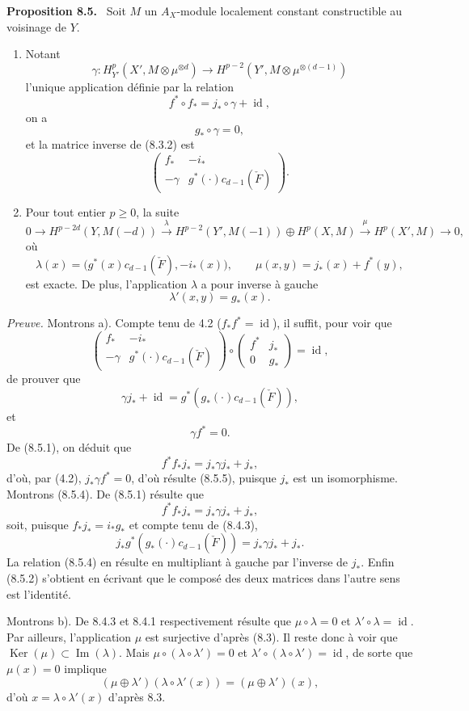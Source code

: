 \documentclass[11pt]{article}
\newenvironment{statement}[1]{\par\medskip\noindent\textbf{#1.}\ }{\par\medskip}
\providecommand{\Ker}{\operatorname{Ker}}
\providecommand{\Ker}{\operatorname{Ker}}
\providecommand{\Ker}{\operatorname{Ker}}
\begin{document}
\begin{statement}{Proposition 8.5}
Soit $M$ un $A_X$-module localement constant constructible au voisinage de $Y$.
\begin{enumerate}[label=\alph*)]
\item Notant
\[
\gamma:H_{Y'}^p(X',M\otimes\mu^{\otimes d})\to
H^{p-2}(Y',M\otimes\mu^{\otimes(d-1)})
\]
l'unique application définie par la relation
\[
f^*\circ f_* = j_*\circ\gamma+\operatorname{id},
\tag{8.5.1}
\]
on a
\[
g_*\circ\gamma=0,
\tag{8.5.2}
\]
et la matrice inverse de (8.3.2) est
\[
\begin{pmatrix}
f_*&-i_*\\
-\gamma&g^*(\cdot)c_{d-1}(\check F)
\end{pmatrix}.
\tag{8.5.3}
\]
\item Pour tout entier $p\ge0$, la suite
\[
0\to H^{p-2d}(Y,M(-d))
\xrightarrow{\lambda}
H^{p-2}(Y',M(-1))\oplus H^p(X,M)
\xrightarrow{\mu}
H^p(X',M)\to0,
\]
où
\[
\lambda(x)=\bigl(g^*(x)c_{d-1}(\check F),-i_*(x)\bigr),
\qquad
\mu(x,y)=j_*(x)+f^*(y),
\]
est exacte. De plus, l'application $\lambda$ a pour inverse à gauche
\[
\lambda'(x,y)=g_*(x).
\]
\end{enumerate}
\end{statement}

\emph{Preuve.} Montrons a). Compte tenu de 4.2 ($f_*f^*=\operatorname{id}$), il suffit, pour voir que
\[
\begin{pmatrix}
f_*&-i_*\\
-\gamma&g^*(\cdot)c_{d-1}(\check F)
\end{pmatrix}
\circ
\begin{pmatrix}
f^*&j_*\\
0&g_*
\end{pmatrix}
=\operatorname{id},
\]
de prouver que
\[
\gamma j_*+\operatorname{id}=g^*(g_*(\cdot)c_{d-1}(\check F)),
\tag{8.5.4}
\]
et
\[
\gamma f^*=0.
\tag{8.5.5}
\]
De (8.5.1), on déduit que
\[
f^*f_*j_*=j_*\gamma j_*+j_*,
\]
d'où, par (4.2), $j_*\gamma f^*=0$, d'où résulte (8.5.5), puisque $j_*$ est un isomorphisme. Montrons (8.5.4). De (8.5.1) résulte que
\[
f^*f_*j_*=j_*\gamma j_*+j_*,
\]
soit, puisque $f_*j_*=i_*g_*$ et compte tenu de (8.4.3),
\[
j_*g^*(g_*(\cdot)c_{d-1}(\check F))=j_*\gamma j_*+j_*.
\]
La relation (8.5.4) en résulte en multipliant à gauche par l'inverse de $j_*$. Enfin (8.5.2) s'obtient en écrivant que le composé des deux matrices dans l'autre sens est l'identité.

Montrons b). De 8.4.3 et 8.4.1 respectivement résulte que $\mu\circ\lambda=0$ et $\lambda'\circ\lambda=\operatorname{id}$. Par ailleurs, l'application $\mu$ est surjective d'après (8.3). Il reste donc à voir que $\Ker(\mu)\subset\operatorname{Im}(\lambda)$. Mais $\mu\circ(\lambda\circ\lambda')=0$ et $\lambda'\circ(\lambda\circ\lambda')=\operatorname{id}$, de sorte que $\mu(x)=0$ implique
\[
(\mu\oplus\lambda')(\lambda\circ\lambda'(x))=(\mu\oplus\lambda')(x),
\]
d'où $x=\lambda\circ\lambda'(x)$ d'après 8.3.
\end{document}
